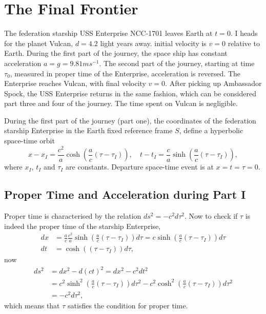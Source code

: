 \documentclass[11pt]{amsart}
\begin{document}
\section{The Final Frontier}
The federation starship USS Enterprise NCC-1701 leaves Earth at $t=0$. I heads for the planet Vulcan, $d=4.2$ light years away. initial velocity is $v=0$ relative to Earth. During the first part of the journey, the space ship has constant acceleration $a = g = 9.81 ms^{-1}$. The second part of the journey, starting at time $\tau_0$, measured in proper time of the Enterprise, acceleration is reversed. The Enterprise reaches Vulcan, with final velocity $v=0$. After picking up Ambassador Spock, the USS Enterprise returns in the same fashion, which can be considered part three and four of the journey. The time spent on Vulcan is negligible.

During the first part of the journey (part one), the coordinates of the federation starship Enterprise in the Earth fixed reference frame $S$, define a hyperbolic space-time orbit
\begin{equation}
\label{eq:pathofenterprise}
x-x_I = \frac{c^2}{a}\cosh\left(\frac{a}{c}(\tau-\tau_I) \right), \quad 
t - t_I = \frac{c}{a}\sinh\left(\frac{a}{c}(\tau - \tau_I) \right),
\end{equation}
where $x_I$, $t_I$ and $\tau_I$ are constants. Departure space-time event is at $x=t=\tau=0$.

\subsection{Proper Time and Acceleration during Part I}
Proper time is characterised by the relation $ds^2 = -c^2d\tau^2$. Now to check if $\tau$ is indeed the proper time of the starship Enterprise,
\begin{align*}
dx &= \frac{a}{c}\frac{c^2}{a}\sinh\left(\frac{a}{c}(\tau-\tau_I) \right)d\tau
= c\sinh\left(\frac{a}{c}(\tau - \tau_I) \right)d\tau \\
dt &= \cosh \left((\tau - \tau_I) \right)d\tau,
\end{align*}
now
\begin{align*}
ds^2 &= dx^2 - d(ct)^2 = dx^2 - c^2dt^2 \\ 
 	&= c^2\sinh^2\left(\frac{a}{c}(\tau - \tau_I)\right)d\tau^2 - c^2\cosh^2\left(\frac{a}{c}(\tau - \tau_I)\right)d\tau^2 \\
 	&= -c^2d\tau^2,
\end{align*}
which means that $\tau$ satisfies the condition for proper time.
\end{document}
